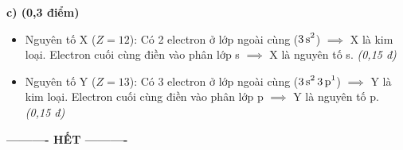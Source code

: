 \documentclass[11pt,a4paper]{article}
\begin{document}
\begin{tcolorbox}[colback=white,colframe=solBlue,title=\textbf{Hướng dẫn giải chi tiết Câu 3 (1,0 điểm):}]
\begin{itemize}[leftmargin=1.0cm]
\begin{itemize}
  \end{itemize}
\end{itemize}
\textbf{c) (0,3 điểm)}
\begin{itemize}[leftmargin=1.0cm]
\item Nguyên tố X ($Z = 12$): Có 2 electron ở lớp ngoài cùng ($\ce{3s^2}$) $\implies$ X là kim loại. Electron cuối cùng điền vào phân lớp s $\implies$ X là nguyên tố s. \hfill \textit{(0,15 đ)}
\item Nguyên tố Y ($Z = 13$): Có 3 electron ở lớp ngoài cùng ($\ce{3s^2 3p^1}$) $\implies$ Y là kim loại. Electron cuối cùng điền vào phân lớp p $\implies$ Y là nguyên tố p. \hfill \textit{(0,15 đ)}
\end{itemize}
\end{tcolorbox}

\vspace{6pt}
\begin{center}
\textbf{\large ---------- HẾT ----------}
\end{center}
\end{document}
